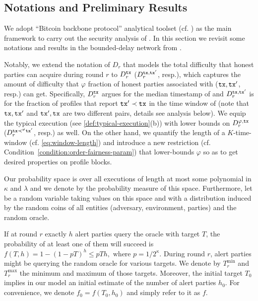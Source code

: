 \subsection{Notations and Preliminary Results}
\label{subsec:notations-preliminary-results}

We adopt ``Bitcoin backbone protocol'' analytical toolset (cf. \cite{C:GarKiaLeo17,EPRINT:GarKiaLeo20}) as the main framework to carry out the security analysis of \Taxis.
%
In this section we revisit some notations and results in the bounded-delay network from \cite{EPRINT:GarKiaLeo20}.

Notably, we extend the notation of $D_r$ that models the total difficulty that honest parties can acquire during round $r$ to $D^\mathtt{tx}_r$ ($D^{\mathtt{tx}, \mathtt{tx}'}_r$, resp.), which captures the amount of difficulty that $\varphi$ fraction of honest parties associated with \tx ($\mathtt{tx}, \mathtt{tx}'$, resp.) can get.
%
Specifically, $D^\mathtt{tx}_r$ argues for the median timestamp of \tx and $D^{\mathtt{tx}, \mathtt{tx}'}_r$ is for the fraction of profiles that report $\mathtt{tx}' \prec \mathtt{tx}$ in the time window of \tx (note that $\mathtt{tx}, \mathtt{tx}'$ and $\mathtt{tx}', \mathtt{tx}$ are two different pairs, details see analysis below).
%
We equip the typical execution (see \cref{def:typical-execution}(b)) with lower bounds on $D^{\varphi, \mathtt{tx}}_r$ ($D^{\mathtt{tx} \prec^\varphi \mathtt{tx}'}_r$, resp.) as well.
%
On the other hand, we quantify the length of a $K$-time-window (cf. \cref{eq:window-length}) and introduce a new restriction (cf. Condition~\cref{condition:order-fairness-param}) that lower-bounds $\varphi$ so as to get desired properties on profile blocks.

Our probability space is over all executions of length at most some polynomial in $\kappa$ and $\lambda$ and we denote by \Pr the probability measure of
this space.
%
Furthermore, let \E be a random variable taking values on this space and with a distribution induced by the random coins of all entities (adversary, environment, parties) and the random oracle.

If at round $r$ exactly $h$ alert parties query the oracle with target $T$, the probability of at least one of them will succeed is $f(T, h) = 1 - (1 - p T)^h \le p T h, \text{ where } p = 1 / 2^\kappa$.
%
During round $r$, alert parties might be querying the random oracle for various targets.
%
We denote by $T_r^{\min}$ and $T_r^{\max}$ the minimum and maximum of those targets.
%
Moreover, the initial target $T_0$ implies in our model an initial estimate of the number of alert parties $h_0$. For convenience, we denote $f_0 = f(T_0, h_0)$ and simply refer to it as $f$.

